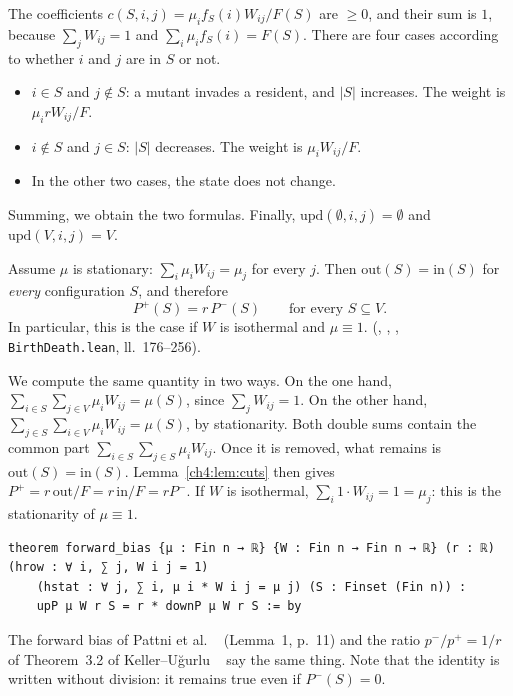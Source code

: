 \begin{humanproof}
The coefficients $c(S,i,j)=\mu_if_S(i)W_{ij}/F(S)$ are $\ge0$, and their sum is $1$, because $\sum_jW_{ij}=1$ and
$\sum_i\mu_if_S(i)=F(S)$. There are four cases according to whether $i$ and $j$ are in $S$ or not.
\begin{itemize}[itemsep=1pt]
\item $i\in S$ and $j\notin S$: a mutant invades a resident, and $|S|$ increases. The weight is $\mu_irW_{ij}/F$.
\item $i\notin S$ and $j\in S$: $|S|$ decreases. The weight is $\mu_iW_{ij}/F$.
\item In the other two cases, the state does not change.
\end{itemize}
Summing, we obtain the two formulas. Finally, $\mathrm{upd}(\emptyset,i,j)=\emptyset$ and $\mathrm{upd}(V,i,j)=V$.
\end{humanproof}

\begin{proposition}\label{ch4:prop:bias}
Assume $\mu$ is stationary: $\sum_i\mu_iW_{ij}=\mu_j$ for every $j$. Then $\mathrm{out}(S)=\mathrm{in}(S)$ for
\emph{every} configuration $S$, and therefore
\[
P^{+}(S)=r\,P^{-}(S)\qquad\text{for every }S\subseteq V .
\]
In particular, this is the case if $W$ is isothermal and $\mu\equiv1$. \tierA{} (,
, , \texttt{BirthDeath.lean}, ll.~176--256).
\end{proposition}

\begin{humanproof}
We compute the same quantity in two ways. On the one hand, $\sum_{i\in S}\sum_{j\in V}\mu_iW_{ij}=\mu(S)$, since
$\sum_jW_{ij}=1$. On the other hand, $\sum_{j\in S}\sum_{i\in V}\mu_iW_{ij}=\mu(S)$, by stationarity. Both double
sums contain the common part $\sum_{i\in S}\sum_{j\in S}\mu_iW_{ij}$. Once it is removed, what remains is
$\mathrm{out}(S)=\mathrm{in}(S)$. Lemma~\ref{ch4:lem:cuts} then gives $P^{+}=r\,\mathrm{out}/F=r\,\mathrm{in}/F=rP^{-}$.
If $W$ is isothermal, $\sum_i1\cdot W_{ij}=1=\mu_j$: this is the stationarity of $\mu\equiv1$.
\end{humanproof}

\begin{leanbox}
\begin{lstlisting}[language=Lean]
theorem forward_bias {μ : Fin n → ℝ} {W : Fin n → Fin n → ℝ} (r : ℝ) (hrow : ∀ i, ∑ j, W i j = 1)
    (hstat : ∀ j, ∑ i, μ i * W i j = μ j) (S : Finset (Fin n)) :
    upP μ W r S = r * downP μ W r S := by
\end{lstlisting}
The forward bias of Pattni et al. \tierL{}~\cite{ch4:PBRS} (Lemma~1, p.~11) and the ratio $p^-/p^+=1/r$ of
Theorem~3.2 of Keller--Uğurlu \tierL{}~\cite{ch4:KU} say the same thing. Note that the identity is written
without division: it remains true even if $P^{-}(S)=0$.
\end{leanbox}


